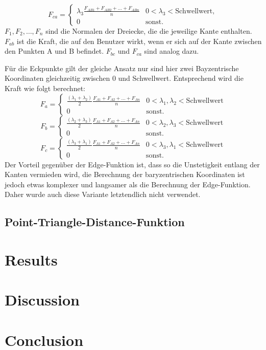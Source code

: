 \documentclass[conference]{IEEEtran}
\begin{document}
\begin{equation*}
    F_{ca} =
    \begin{cases} 
        \lambda_3 \frac{{ F_{AB1} + F_{AB2} + \ldots + F_{ABn}}}{n} &  0 < \lambda_3 < \text{Schwellwert}, \\
        0 & \text{sonst.}
    \end{cases}
\end{equation*}
$F_1, F_2, \ldots, F_n$ sind die Normalen der Dreiecke, die die jeweilige Kante enthalten. 
$F_{ab}$ ist die Kraft, die auf den Benutzer wirkt, wenn er sich auf der Kante zwischen den 
Punkten A und B befindet. $F_{bc}$ und $F_{ca}$ sind analog dazu.

Für die Eckpunkte gilt der gleiche Ansatz nur sind hier zwei Bayzentrische Koordinaten gleichzeitig 
zwischen 0 und Schwellwert. Entsprechend wird die Kraft wie folgt berechnet:
\begin{equation*}
    F_{a} = 
    \begin{cases} 
        \frac{(\lambda_1 + \lambda_2)}{2} \frac{{ F_{A1} + F_{A2} + \ldots + F_{An}}}{n} &  0 < \lambda_1, \lambda_2 < \text{Schwellwert} \\
        0 & \text{sonst.}
    \end{cases}
\end{equation*} 
\begin{equation*}
    F_{b} = 
    \begin{cases} 
        \frac{(\lambda_2 + \lambda_3)}{2} \frac{{ F_{A1} + F_{A2} + \ldots + F_{An}}}{n} &  0 < \lambda_2, \lambda_3 < \text{Schwellwert} \\
        0 & \text{sonst.}
    \end{cases}
\end{equation*} 
\begin{equation*}
    F_{c} = 
    \begin{cases} 
        \frac{(\lambda_3 + \lambda_1)}{2} \frac{{ F_{A1} + F_{A2} + \ldots + F_{An}}}{n} &  0 < \lambda_3, \lambda_1 < \text{Schwellwert} \\
        0 & \text{sonst.}
    \end{cases}
\end{equation*} 
Der Vorteil gegenüber der Edge-Funktion ist, dass so die Unstetigkeit entlang der Kanten vermieden wird, 
die Berechnung der baryzentrischen Koordinaten ist jedoch etwas komplexer und langsamer als die 
Berechnung der Edge-Funktion. Daher wurde auch diese Variante letztendlich nicht verwendet.

\subsection{Point-Triangle-Distance-Funktion}


\section{Results}

\section{Discussion}

\section{Conclusion}

\printbibliography
\end{document}
